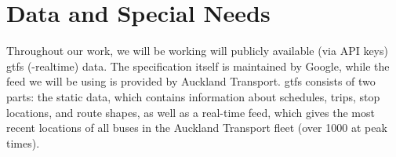 \documentclass[12pt,a4paper]{article}
\begin{document}
\section{Data and Special Needs}
\label{sec:data}























Throughout our work, we will be working will publicly available (via API keys) \gls{gtfs}
(-realtime) data.
The specification itself is maintained by Google, 
while the feed we will be using is provided by Auckland Transport.
\gls{gtfs} consists of two parts:
the static data, which contains information about schedules, trips, stop locations,
and route shapes, as well as a real-time feed, which gives the most recent locations
of all buses in the Auckland Transport fleet (over 1000 at peak times).
\end{document}

